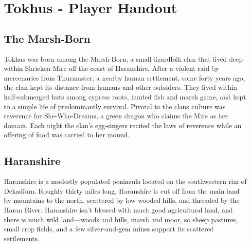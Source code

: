 \documentclass[letterpaper,twocolumn,openany,nodeprecatedcode,bg=full]{dndbook}
\begin{document}
\mainmatter%

\chapter{Tokhus - Player Handout}


\section{The Marsh-Born}
Tokhus was born among the Marsh‑Born, a small lizardfolk clan that lived deep within Shrieken Mire off the coast of Haranshire. After a violent raid by mercenaries from Thurmaster, a nearby human settlement, some forty years ago, the clan kept its distance from humans and other outsiders. They lived within half‑submerged huts among cypress roots, hunted fish and marsh game, and kept to a simple life of predominantly survival. Pivotal to the clans culture was reverence for She-Who-Dreams, a green dragon who claims the Mire as her domain. Each night the clan’s egg‑singers recited the laws of reverence while an offering of food was carried to her mound.

\section{Haranshire}
Haranshire is a modestly populated peninsula located on the southwestern rim of Dekadium. Roughly thirty miles long, Haranshire is cut off from the main land by mountains to the north, scattered by low wooded hills, and threaded by the Haran River. Haranshire isn't blessed with much good agricultural land, and there is much wild land—woods and hills, marsh and moor, so sheep pastures, small crop fields, and a few silver‑and‑gem mines support its scattered settlements.
\end{document}
